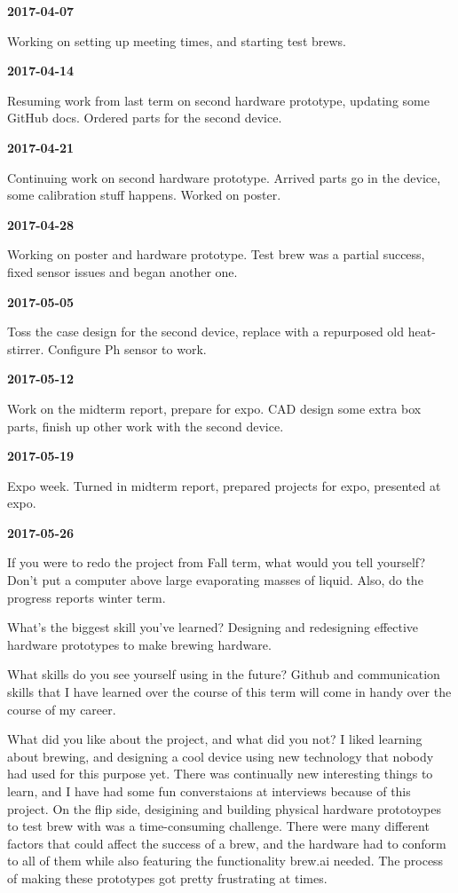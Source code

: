 \textbf{2017-04-07} 

Working on setting up meeting times, and starting test brews.

\textbf{2017-04-14} 

Resuming work from last term on second hardware prototype, updating some GitHub docs. Ordered parts for the second device.

\textbf{2017-04-21} 

Continuing work on second hardware prototype. Arrived parts go in the device, some calibration stuff happens. Worked on poster.

\textbf{2017-04-28} 

Working on poster and hardware prototype. Test brew was a partial success, fixed sensor issues and began another one.


\textbf{2017-05-05} 

Toss the case design for the second device, replace with a repurposed old heat-stirrer. Configure Ph sensor to work.

\textbf{2017-05-12} 

Work on the midterm report, prepare for expo. CAD design some extra box parts, finish up other work with the second device.

\textbf{2017-05-19} 

Expo week. Turned in midterm report, prepared projects for expo, presented at expo.

\textbf{2017-05-26} 

 If you were to redo the project from Fall term, what would you tell yourself?
Don't put a computer above large evaporating masses of liquid. Also, do the progress reports winter term.

 What's the biggest skill you've learned?
Designing and redesigning effective hardware prototypes to make brewing hardware.

 What skills do you see yourself using in the future?
Github and communication skills that I have learned over the course of this term will come in handy over the course of my career.

 What did you like about the project, and what did you not?
I liked learning about brewing, and designing a cool device using new technology that nobody had used for this purpose yet. There was continually new interesting things to learn, and I have had some fun converstaions at interviews because of this project. On the flip side, desigining and building physical hardware prototoypes to test brew with was a time-consuming challenge. There were many different factors that could affect the success of a brew, and the hardware had to conform to all of them while also featuring the functionality brew.ai needed. The process of making these prototypes got pretty frustrating at times.

